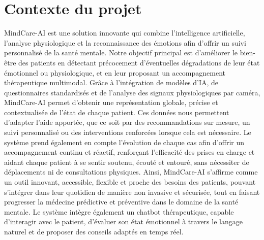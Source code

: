 \section{Contexte du projet}
MindCare-AI est une solution innovante qui combine l’intelligence artificielle, l’analyse physiologique et la reconnaissance des émotions afin d’offrir un suivi personnalisé de la santé mentale.  
Notre objectif principal est d’améliorer le bien-être des patients en détectant précocement d’éventuelles dégradations de leur état émotionnel ou physiologique, et en leur proposant un accompagnement thérapeutique multimodal.  
Grâce à l’intégration de modèles d’IA, de questionnaires standardisés et de l’analyse des signaux physiologiques par caméra, MindCare-AI permet d’obtenir une représentation globale, précise et contextualisée de l’état de chaque patient.  
Ces données nous permettent d’adapter l’aide apportée, que ce soit par des recommandations sur mesure, un suivi personnalisé ou des interventions renforcées lorsque cela est nécessaire.  
Le système prend également en compte l’évolution de chaque cas afin d’offrir un accompagnement continu et réactif, renforçant l’efficacité des prises en charge et aidant chaque patient à se sentir soutenu, écouté et entouré, sans nécessiter de déplacements ni de consultations physiques.  
Ainsi, MindCare-AI s’affirme comme un outil innovant, accessible, flexible et proche des besoins des patients, pouvant s’intégrer dans leur quotidien de manière non invasive et sécurisée, tout en faisant progresser la médecine prédictive et préventive dans le domaine de la santé mentale.  
Le système intègre également un chatbot thérapeutique, capable d’interagir avec le patient, d’évaluer son état émotionnel à travers le langage naturel et de proposer des conseils adaptés en temps réel.

